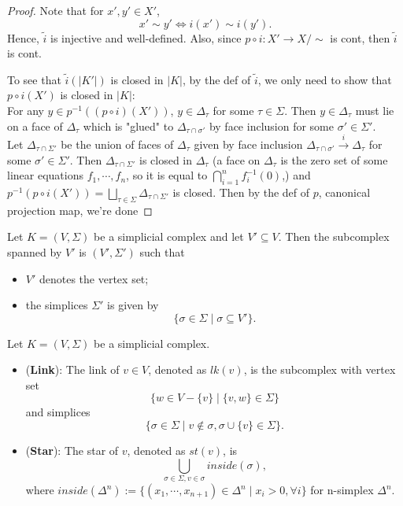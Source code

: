 \begin{proof}
    Note that for $x',y' \in X'$, 
    $$x' \sim y' \Leftrightarrow i(x') \sim i(y').$$
    Hence, $\widetilde{i}$ is injective and well-defined. Also, since $p\circ i: X' \rightarrow X/\sim$ is cont, then $\widetilde{i}$ is cont.

    To see that $\widetilde{i} (|K'|) $ is closed in $|K|$, by the def of $\widetilde{i}$, we only need to show that $p\circ i(X')$ is closed in $|K|$:\\
    For any $y \in p^{-1}((p\circ i)(X'))$, $y \in \Delta_\tau$ for some $\tau \in \Sigma$. Then $y \in \Delta_\tau$ must lie on a face of $\Delta_\tau$ which is "glued" to $\Delta_{\tau \cap \sigma'}$ by face inclusion for some $\sigma' \in \Sigma '$.\\
    Let $\Delta_{\tau \cap \Sigma'}$ be the union of faces of $\Delta_\tau$ given by face inclusion $\Delta_{\tau \cap \sigma'} \overset{i}{\rightarrow} \Delta_{\tau}$ for some $\sigma' \in \Sigma'$. Then $\Delta_{\tau \cap \Sigma'}$ is closed in $\Delta_\tau$ (a face on $\Delta_\tau$ is the zero set of some linear equations $f_1, \cdots,f_n$, so it is equal to $\bigcap_{i=1}^n f_i^{-1}(0)$,) and $p^{-1} (p \circ i (X')) = \bigsqcup_{\tau \in \Sigma} \Delta_{\tau \cap \Sigma'}$ is closed. Then by the def of $p$, canonical projection map, we're done
\end{proof}

\begin{definition}
    Let $K = (V,\Sigma)$ be a simplicial complex and let $V' \subseteq V$. Then the subcomplex spanned by $V'$ is $(V',\Sigma')$ such that
    \begin{itemize}
        \item $V'$ denotes the vertex set;
        \item the simplices $\Sigma'$ is given by $$\{ \sigma \in \Sigma \mid \sigma \subseteq V' \}.$$
    \end{itemize}
\end{definition}

\begin{definition}
    Let $K= (V,\Sigma)$ be a simplicial complex.
    \begin{itemize}
        \item (\textbf{Link}): The link of $v \in V$, denoted as $lk(v)$, is the subcomplex with vertex set
        $$\{ w\in V-\{v\} \mid \{v,w\} \in \Sigma \}$$
        and simplices
        $$\{ \sigma \in \Sigma \mid v \notin \sigma, \sigma \cup \{v\} \in \Sigma \}.$$
        \item (\textbf{Star}): The star of $v$, denoted as $st(v)$, is
        $$\bigcup_{\sigma \in \Sigma,v \in \sigma} inside(\sigma),$$
        where $inside(\Delta^n) := \{ (x_1,\cdots,x_{n+1}) \in \Delta^n \mid x_i > 0, \forall i \}$ for n-simplex $\Delta^n$.
    \end{itemize}
\end{definition}


